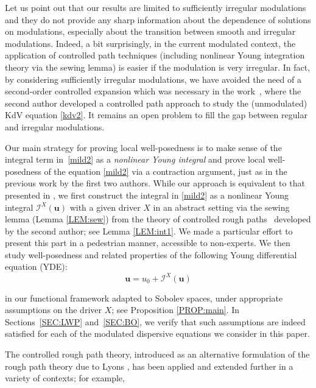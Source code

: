 \documentclass[letterpaper, 11pt,  reqno]{amsart}
\newcommand{\1}{\hspace{0.5mm}\text{I}\hspace{0.5mm}}
\newcommand{\I}{\mathcal{I}}
\newcommand{\noi}{\noindent}
\newcommand{\uu}{\mathbf{u}}
\numberwithin{equation}{section}
\numberwithin{theorem}{section}
\begin{document}
Let us point  out that our results are limited to 
sufficiently irregular modulations 
and they do not provide any sharp information about the dependence of solutions on modulations, especially about the transition between smooth and irregular modulations. 
Indeed, a bit surprisingly, in the current modulated context,  the application of 
 controlled path techniques (including nonlinear Young integration theory via the sewing lemma) is easier if the modulation is very irregular. 
In fact, by considering
sufficiently irregular modulations, 
we have avoided the need of  
a second-order controlled expansion which was necessary in
the work~\cite{GubinelliKdV}, where the second author developed a controlled path
approach to study the (unmodulated) KdV equation \eqref{kdv2}.
It remains   an open problem to fill the gap between regular and  irregular modulations. 




 

Our main strategy for proving local well-posedness is to make sense of the integral term in~\eqref{mild2}
as a {\it nonlinear Young integral}
and prove local well-posedness of  the equation \eqref{mild2}
via a contraction argument, 
just as in the previous work \cite{CG1}
by the first two authors.
While our approach is equivalent
to that presented in \cite{CG1}, 
we first construct the integral in \eqref{mild2}
as a nonlinear Young integral
$\I^X(\uu)$ with a given driver $X$
in an abstract setting
via the sewing lemma
(Lemma \ref{LEM:sew})
from 
the theory of controlled rough paths~\cite{Gub04}
developed by the second author; see Lemma \ref{LEM:int1}.
We made a particular effort to 
present this part 
in a pedestrian manner, accessible
to non-experts.
We then study well-posedness and related properties of the following
Young differential equation (YDE):
\begin{equation}
\uu = u_0 + \I^X(\uu)
\label{YDE0}
\end{equation}

\noi
in our functional framework adapted to Sobolev spaces, 
under appropriate assumptions 
on the driver $X$; 
see Proposition \ref{PROP:main}.
In Sections~\ref{SEC:LWP} and~\ref{SEC:BO}, 
we verify 
that such assumptions are indeed satisfied
for each of the modulated dispersive equations
we consider in this paper.









The controlled rough path theory, 
introduced 
as an alternative formulation of the rough path theory
due to Lyons
\cite{Lyons1, Lyons2}, 
has been applied and extended further in a variety of contexts; 
for example, 
\end{document}
